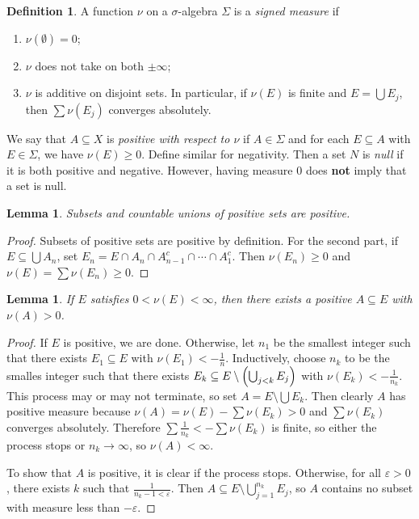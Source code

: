 \documentclass[leqno, openany]{memoir}
\newtheorem{lem}[thm]{Lemma}
\theoremstyle{definition}
\newtheorem{defn}[thm]{Definition}
\theoremstyle{remark}
\theoremstyle{plain}
\theoremstyle{definition}
\theoremstyle{remark}
\newcommand{\ep}{\varepsilon}
\begin{document}
\begin{defn}
    A function $\nu$ on a $\sigma$-algebra $\Sigma$ is a \textit{signed measure} if
    \begin{enumerate}
        \item $\nu(\emptyset) = 0$;
        \item $\nu$ does not take on both $\pm \infty$;
        \item $\nu$ is additive on disjoint sets. In particular, if $\nu(E)$ is finite and $E = \bigcup E_j$, then $\sum \nu(E_j)$ converges absolutely.
    \end{enumerate}
\end{defn}

We say that $A \subseteq X$ is \textit{positive with respect to $\nu$} if $A \in \Sigma$ and for each $E \subseteq A$ with $E \in \Sigma$, we have $\nu(E) \geq 0$. Define similar for negativity. Then a set $N$ is \textit{null} if it is both positive and negative. However, having measure $0$ does \textbf{not} imply that a set is null.

\begin{lem}
    Subsets and countable unions of positive sets are positive.
\end{lem}

\begin{proof}
    Subsets of positive sets are positive by definition. For the second part, if $E \subseteq \bigcup A_n$, set $E_n = E \cap A_n \cap A_{n-1}^c \cap  \cdots \cap A_1^c$. Then $\nu(E_n) \geq 0$ and $\nu(E) = \sum \nu(E_n) \geq 0$.
\end{proof}

\begin{lem}
    If $E$ satisfies $0 < \nu(E) < \infty$, then there exists a positive $A \subseteq E$ with $\nu(A) > 0$.
\end{lem}

\begin{proof}
    If $E$ is positive, we are done. Otherwise, let $n_1$ be the smallest integer such that there exists $E_1 \subseteq E$ with $\nu(E_1) < - \frac{1}{n}$. Inductively, choose $n_k$ to be the smalles integer such that there exists $E_k \subseteq E \setminus \qty(\bigcup_{j<k} E_j)$ with $\nu(E_k) < - \frac{1}{n_k}$. This process may or may not terminate, so set $A = E \setminus \bigcup E_k$. Then clearly $A$ has positive measure because $\nu(A) = \nu(E) - \sum \nu(E_k) > 0$ and $\sum \nu(E_k)$ converges absolutely. Therefore $\sum \frac{1}{n_k} < - \sum \nu(E_k)$ is finite, so either the process stops or $n_k \to \infty$, so $\nu(A) < \infty$. 

    To show that $A$ is positive, it is clear if the process stops. Otherwise, for all $\ep > 0$, there exists $k$ such that $\frac{1}{n_{k} - 1 < \ep}$. Then $A \subseteq E \setminus \bigcup_{j=1}^{n_k} E_j$, so $A$ contains no subset with measure less than $- \ep$. 
\end{proof}
\end{document}
